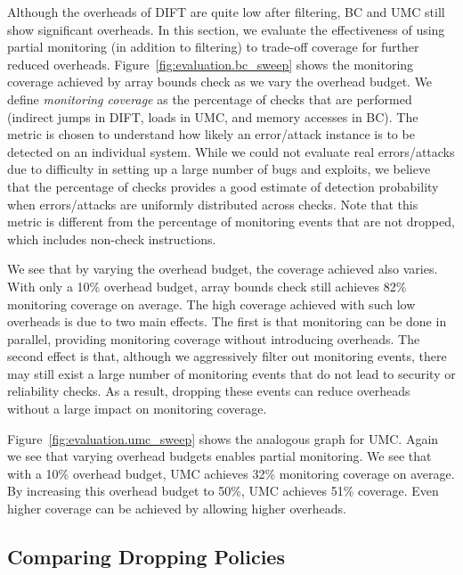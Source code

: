 Although the overheads of DIFT are quite low after filtering, BC and UMC still
show significant overheads. In this section, we evaluate the effectiveness of
using partial monitoring (in addition to filtering) to trade-off coverage for further reduced overheads.
Figure~\ref{fig:evaluation.bc_sweep} shows the monitoring coverage achieved by
array bounds check as we vary the overhead budget. 
We define \emph{monitoring coverage} as the 
percentage of checks that are performed 
(indirect jumps in DIFT, loads in UMC, and memory accesses in BC). 
The metric is chosen to understand
how likely an error/attack instance is to be detected on an individual system. 
While we could not evaluate real errors/attacks due to difficulty in setting up
a large number of bugs and exploits, we believe that the percentage of checks
provides a good estimate of detection probability when errors/attacks are 
uniformly distributed across checks.
Note that this metric is different from the
percentage of monitoring events that are not dropped, which includes
non-check instructions.

We see that by varying the overhead budget, the coverage achieved also varies.
With only a 10\% overhead budget, array bounds check still
achieves 82\% monitoring coverage on average. The high coverage
achieved with such low overheads is due to two main effects.  The first is that
monitoring can be done in parallel, providing monitoring coverage without
introducing overheads. The second effect is that, although we aggressively
filter out monitoring events, there may still exist a large number of
monitoring events that do not lead to security or reliability checks. As a
result, dropping these events can reduce overheads without a large impact on
monitoring coverage.

Figure~\ref{fig:evaluation.umc_sweep} shows the analogous graph for UMC. Again
we see that varying overhead budgets enables partial monitoring. We see that
with a 10\% overhead budget, UMC achieves 32\% monitoring coverage on average.
By increasing this overhead budget to 50\%, UMC achieves 51\% coverage. Even
higher coverage can be achieved by allowing higher overheads.

\subsection{Comparing Dropping Policies}

